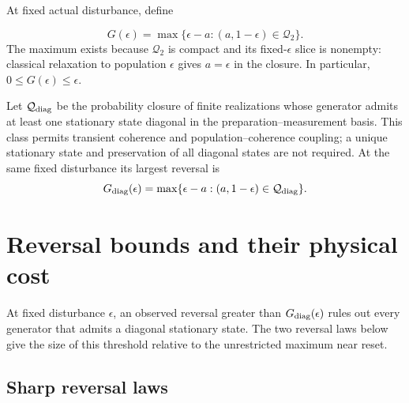 \documentclass[aps,pra,reprint,amsmath,amssymb,nofootinbib,floatfix,longbibliography]{revtex4-2}
\theoremstyle{aps}
\newcommand{\Q}{\mathcal Q_2}
\newcommand{\eps}{\epsilon}
\begin{document}
At fixed actual disturbance, define

\begin{equation}\label{eq:G}
 G(\eps)=\max\{\eps-a:(a,1-\eps)\in\Q\}.
\end{equation}
The maximum exists because $\Q$ is compact and its fixed-$\eps$ slice is nonempty: classical relaxation to population $\eps$ gives $a=\eps$ in the closure. In particular, $0\le G(\eps)\le\eps$.

Let $\mathcal Q_{\rm diag}$ be the probability closure of finite realizations whose generator admits at least one stationary state diagonal in the preparation--measurement basis. This class permits transient coherence and population--coherence coupling; a unique stationary state and preservation of all diagonal states are not required. At the same fixed disturbance its largest reversal is
\begin{equation}\label{eq:G-diag}
 G_{\rm diag}(\eps)=\max\{\eps-a:(a,1-\eps)\in\mathcal Q_{\rm diag}\}.
\end{equation}

\section{Reversal bounds and their physical cost}\label{sec:results}\label{sec:diagonal}

At fixed disturbance $\eps$, an observed reversal greater than $G_{\rm diag}(\eps)$ rules out every generator that admits a diagonal stationary state. The two reversal laws below give the size of this threshold relative to the unrestricted maximum near reset.

\subsection{Sharp reversal laws}
\end{document}
